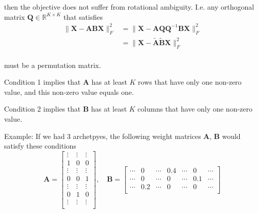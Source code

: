 \documentclass[oneside]{article}
\begin{document}
then the objective does not suffer from rotational ambiguity. I.e. any orthogonal matrix $\mathbf{Q} \in \mathbb{R}^{K \times K}$ that satisfies
\begin{equation}
    \begin{aligned}
    \| \mathbf{X} - \mathbf{A} \mathbf{B} \mathbf{X}\|_F^2
    &= \| \mathbf{X} - \mathbf{A} \mathbf{Q} \mathbf{Q}^{-1} \mathbf{B} \mathbf{X}\|_F^2 \\
    &= \| \mathbf{X} - \tilde{\mathbf{A}} \tilde{\mathbf{B}} \mathbf{X}\|_F^2 \\
    \end{aligned}
\end{equation}

must be a permutation matrix.

Condition 1 implies that $\mathbf{A}$ has at least $K$ rows that have only one non-zero value, and this non-zero value equals one.

Condition 2 implies that $\mathbf{B}$ has at least $K$ columns that have only one non-zero value.

Example: If we had $3$ archetpyes, the following weight matrices $\mathbf{A}$, $\mathbf{B}$ would satisfy these conditions
\begin{equation}
    \mathbf{A} =
    \left[
        \begin{array}{ccc}
            \vdots & \vdots & \vdots \\
            1 & 0 & 0 \\
            \vdots & \vdots & \vdots \\
            0 & 0 & 1 \\
            \vdots & \vdots & \vdots \\
            0 & 1 & 0 \\
            \vdots & \vdots & \vdots \\
        \end{array}
    \right]
    , \quad
    \mathbf{B} =
    \left[
        \begin{array}{ccccccc}
            \cdots & 0 & \cdots & 0.4 & \cdots & 0 & \cdots \\
            \cdots & 0 & \cdots & 0 & \cdots & 0.1 & \cdots \\
            \cdots & 0.2 & \cdots & 0 & \cdots & 0 & \cdots \\
        \end{array}
    \right]
\end{equation}

\end{document}
